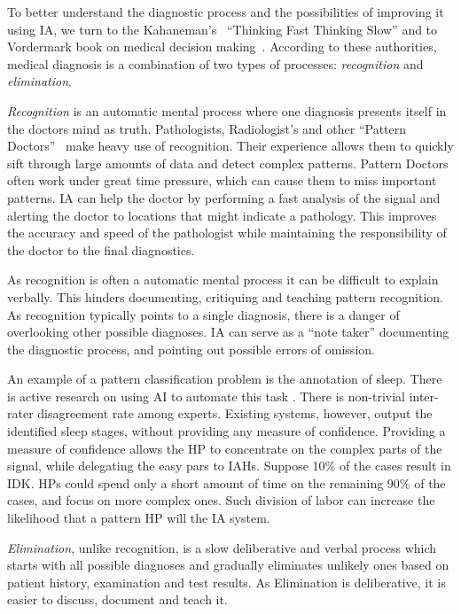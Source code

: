 \documentclass[11pt]{pnas-new}
\begin{document}
To better understand the diagnostic process and the possibilities  of
improving it using IA, we turn to the Kahaneman's~\cite{kahneman2011thinking}
``Thinking Fast Thinking Slow'' and to Vordermark book on medical
decision making~\cite{vordermark2019introduction}. According to these authorities,
medical diagnosis is a combination of two types of processes: {\em
  recognition} and {\em elimination}.

{\em Recognition} is an automatic mental process where one diagnosis
presents itself in the doctors mind as truth. Pathologists,
Radiologist's and other ``Pattern Doctors''~\cite{topol2019deep} make heavy use
of recognition. Their experience allows them to quickly sift through
large amounts of data and detect complex patterns. Pattern Doctors 
often work under great time pressure, which can cause them to miss
important patterns. IA can help the doctor by performing a fast
analysis of the signal and alerting the doctor to locations that might
indicate a pathology. This improves the accuracy and speed of the
pathologist while maintaining the responsibility of the doctor to the
final diagnostics. 

As recognition is often a automatic mental process it can be difficult to explain verbally.
This hinders documenting, critiquing and teaching pattern recognition. As
recognition typically points to a single diagnosis, there is a danger
of overlooking other possible diagnoses. IA can serve as a ``note
taker'' documenting the diagnostic process, and pointing out possible
errors of omission. 

An example of a pattern classification problem is the annotation of
sleep. There is active research on using AI to automate this task
\cite{sleepHT2020}.
There is non-trivial inter-rater disagreement rate among experts.  
Existing systems, however, output the identified sleep stages, 
without providing any measure of confidence. Providing a measure of confidence allows the HP to concentrate on the complex parts of the signal, while delegating the easy pars to IAHs. 
Suppose 10\% of the cases result in IDK. HPs could spend only a short amount of time on the remaining 90\% of the cases, and focus on more complex ones.
Such division of labor can increase the likelihood that a pattern HP will  the IA system.

{\em Elimination}, unlike recognition, is a slow deliberative and
verbal process which starts with all possible diagnoses and gradually
eliminates unlikely ones based on patient history, examination and
test results. As Elimination is deliberative, it is easier to discuss,
document and teach it.
\end{document}
